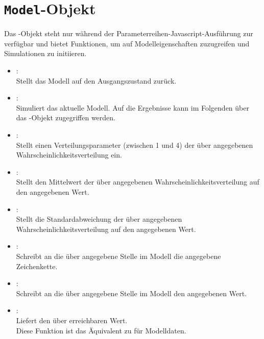 \chapter{\texttt{Model}-Objekt}

Das -Objekt steht nur während der Parameterreihen-Javascript-Ausführung
zur verfügbar und bietet Funktionen, um auf Modelleigenschaften zuzugreifen und
Simulationen zu initiieren.

\begin{itemize}

\item
{}:\\
Stellt das Modell auf den Ausgangszustand zurück.

\item
{}:\\
Simuliert das aktuelle Modell.
Auf die Ergebnisse kann im Folgenden über das -Objekt zugegriffen werden.

\item
{}:\\
Stellt einen Verteilungsparameter  (zwischen 1 und 4) der über 
angegebenen Wahrscheinlichkeitsverteilung ein.

\item
{}:\\
Stellt den Mittelwert der über  angegebenen Wahrscheinlichkeitsverteilung auf den angegebenen Wert.

\item
{}:\\
Stellt die Standardabweichung der über  angegebenen Wahrscheinlichkeitsverteilung auf den angegebenen Wert.

\item
{}:\\
Schreibt an die über  angegebene Stelle im Modell die angegebene Zeichenkette.

\item
{}:\\
Schreibt an die über  angegebene Stelle im Modell den angegebenen Wert.

\item
{}:\\
Liefert den über  erreichbaren Wert.\\
Diese Funktion ist das Äquivalent zu  für Modelldaten.


\end{itemize}
